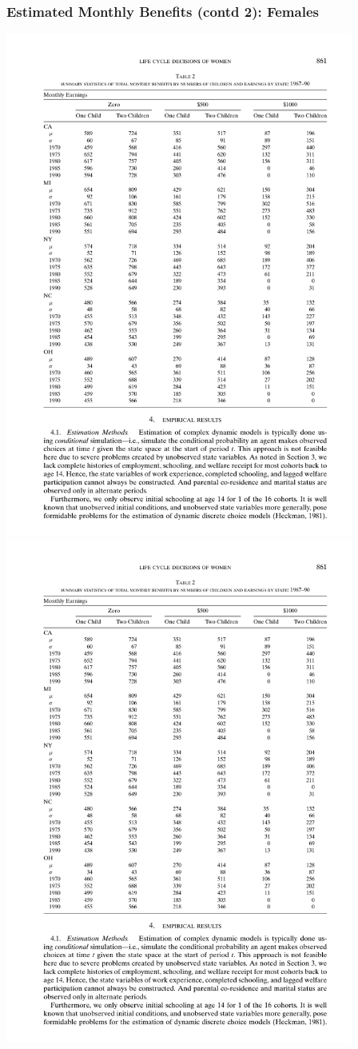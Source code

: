 \begin{frame}
	\frametitle{Estimated Monthly Benefits (contd 2): Females}
	\includegraphics[width=4.5in]{tab-figs/table2b_2010-1} \\
	\includegraphics[width=4.5in]{tab-figs/table2c__2010}
\end{frame}

